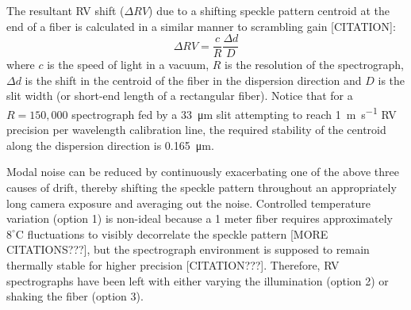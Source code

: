 \documentclass[twocolumn]{emulateapj}
\begin{document}

The resultant RV shift ($\Delta RV$) due to a shifting speckle pattern centroid at the end of a fiber is calculated in a similar manner to scrambling gain [CITATION]:
\begin{equation}
\Delta RV = \frac{c}{R} \frac{\Delta d}{D}
\label{eq:rv_error}
\end{equation}
where $c$ is the speed of light in a vacuum, $R$ is the resolution of the spectrograph, $\Delta d$ is the shift in the centroid of the fiber in the dispersion direction and $D$ is the slit width (or short-end length of a rectangular fiber). Notice that for a $R=150,000$ spectrograph fed by a \SI{33}{\micro\meter} slit attempting to reach \SI{1}{\meter\per\second} RV precision per wavelength calibration line, the required stability of the centroid along the dispersion direction is \SI{0.165}{\micro\meter}.

Modal noise can be reduced by continuously exacerbating one of the above three causes of drift, thereby shifting the speckle pattern throughout an appropriately long camera exposure and averaging out the noise. Controlled temperature variation (option 1) is non-ideal because a 1 meter fiber requires approximately $8 ^\circ \mathrm{C}$ fluctuations to visibly decorrelate the speckle pattern \citep{Redding2013} [MORE CITATIONS???], but the spectrograph environment is supposed to remain thermally stable for higher precision [CITATION???]. Therefore, RV spectrographs have been left with either varying the illumination (option 2) or shaking the fiber (option 3).
\end{document}
